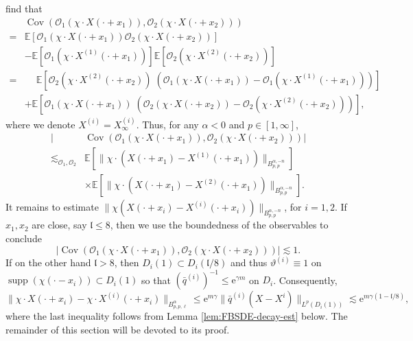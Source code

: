 \documentclass[11pt, a4paper]{scrartcl}
\numberwithin{equation}{section}
\theoremstyle{plain}
\theoremstyle{remark}
\newcommand{\mathe}{\mathrm{e}}
\newcommand{\tmop}[1]{\ensuremath{\operatorname{#1}}}
\begin{document}
find that
\[ \begin{aligned}
     & \tmop{Cov} (\mathcal{O}_1 (\chi \cdot X (\cdot + x_1)), \mathcal{O}_2
     (\chi \cdot X (\cdot + x_2)))\\
     = & \mathbb{E} [\mathcal{O}_1 (\chi \cdot X (\cdot + x_1))  \mathcal{O}_2
     (\chi \cdot X (\cdot + x_2))] \\
     &-\mathbb{E} [\mathcal{O}_1 (\chi \cdot X^{(1)}
     (\cdot + x_1))] \mathbb{E} [\mathcal{O}_2 (\chi \cdot X^{(2)} (\cdot +
     x_2))]\\
     = & \phantom{+}\mathbb{E} [\mathcal{O}_2 (\chi \cdot X^{(2)}
     (\cdot + x_2))\;(\mathcal{O}_1 (\chi \cdot X (\cdot + x_1)) -
     \mathcal{O}_1 (\chi \cdot X^{(1)} (\cdot + x_1)))]\\
     & +\mathbb{E} [\mathcal{O}_1 (\chi \cdot X (\cdot + x_1)) \; (\mathcal{O}_2
     (\chi \cdot X (\cdot + x_2)) - \mathcal{O}_2 (\chi \cdot X^{(2)} (\cdot +
     x_2)))],
   \end{aligned} \]
where we denote $X^{(i)} = X^{(i)}_{\infty}$. Thus, for any $\alpha < 0$ and
$p \in [1, \infty]$, 
\[ \begin{aligned}
|&\tmop{Cov}(\mathcal{O}_1 (\chi \cdot X (\cdot + x_1)), \mathcal{O}_2
   (\chi \cdot X (\cdot + x_2))) | \\
   \lesssim_{\mathcal{O}_1, \mathcal{O}_2}&
   \mathbb{E} \left[\| \chi \cdot (X (\cdot + x_1) - X^{(1)} (\cdot + x_1))
   \|_{B^{\alpha, - n}_{p, p}}\right]\\
    &\times
    \mathbb{E} \left[\| \chi \cdot (X (\cdot + x_1) - X^{(2)} (\cdot + x_1))
    \|_{B^{\alpha, - n}_{p, p}}\right].
\end{aligned}\]
It remains to estimate $\| \chi (X (\cdot + x_i) - X^{(i)} (\cdot + x_i))
\|_{B_{p, p}^{\alpha, - n}}$, for $i=1,2$. If $x_1, x_2$ are close, say $\mathfrak{l}
\leqslant 8$, then we use the boundedness of the observables to conclude
\[ | \tmop{Cov} (\mathcal{O}_1 (\chi \cdot X (\cdot + x_1)), \mathcal{O}_2
   (\chi \cdot X (\cdot + x_2))) | \lesssim 1. \]
If on the other hand $\mathfrak{l}> 8$, then $D_i (1) \subset D_i
(\mathfrak{l}/ 8)$ and thus $\vartheta^{(i)} \equiv 1$ on $\tmop{supp} (\chi (\cdot
- x_i)) \subset D_i (1)$ so that $(\bar{q}^{(i)})^{- 1} \leqslant \mathe^{\gamma m}$
on $D_i$. Consequently,
\[ \| \chi \cdot X (\cdot + x_i) - \chi \cdot X^{(i)} (\cdot + x_i) \|_{B_{p,
   p, \ell}^{\alpha}} \leqslant \mathe^{m \gamma}  \| \bar{q}^{(i)} (X - X^i)
   \|_{L^p (D_i (1))} \lesssim \mathe^{m \gamma (1 -\mathfrak{l}/ 8)}, \]
where the last inequality follows from Lemma \ref{lem:FBSDE-decay-est} below.
The remainder of this section will be devoted to its proof.
\end{document}
